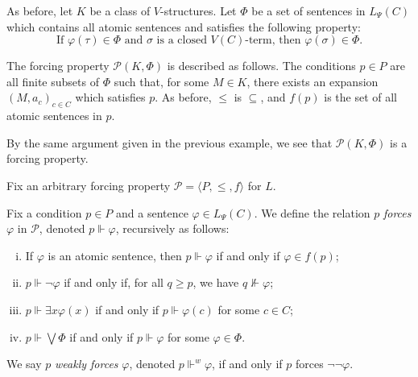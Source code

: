 \documentclass{scrartcl}
\renewcommand{\phi}{\varphi}
\newcommand{\SP}{\mathscr{P}}
\begin{document}
\begin{examples}
\begin{enumerate}
As before, let $K$ be a class of $V$-structures.
Let $\Phi$ be a set of sentences in $L_\Psi(C)$ which contains all atomic sentences and satisfies the following property:
\[
\text{If $\phi(\tau)\in \Phi$ and $\sigma$ is a closed $V(C)$-term, then $\phi(\sigma)\in \Phi$.}
\]

The forcing property $\SP(K,\Phi)$ is described as follows. The conditions $p\in P$ are all finite subsets of $\Phi$ such that, for some $M\in K$, there exists an expansion $(M,a_c)_{c\in C}$ which satisfies $p$.
As before, $\le$ is $\subseteq$, and $f(p)$ is the set of all atomic sentences in $p$.

By the same argument given in the previous example, we see that $\SP(K,\Phi)$ is a forcing property.
\end{enumerate}

\end{examples}



Fix an arbitrary forcing property $\SP = \langle P, \le, f \rangle$ for $L$.

\begin{definition}
Fix a condition $p\in P$ and a sentence $\phi\in L_\Psi(C)$. We define the relation $p$ \emph{forces} $\phi$ in $\SP$, denoted $p\Vdash \phi$, recursively as follows:

\begin{enumerate}[i)]
\item If $\phi$ is an atomic sentence, then $p\Vdash \phi$ if and only if $\phi \in f(p)$;
\item $p\Vdash \neg\phi$ if and only if, for all $q\ge p$, we have $q \not \Vdash \phi$;
\item $p\Vdash \exists x\phi(x)$ if and only if $p\Vdash \phi(c)$ for some $c\in C$;
\item $p\Vdash \bigvee \Phi$ if and only if $p\Vdash \phi$ for some $\phi\in \Phi$.
\end{enumerate}

We say $p$ \emph{weakly forces} $\phi$, denoted $p\Vdash^w \phi$, if and only if $p$ forces $\neg \neg \phi$.
\end{definition}
\end{document}
